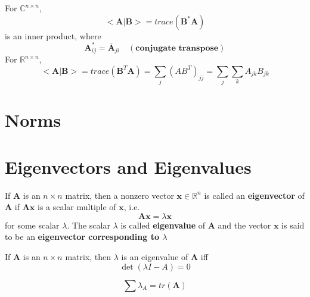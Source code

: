 			\begin{example}
				For $\mathbb{C}^{n\times n}$, 
				\begin{equation}
					<\mathbf{A}|\mathbf{B}> = trace(\mathbf{B}^* \mathbf{A})
				\end{equation}
				is an inner product, where
				\begin{equation}
					\mathbf{A}^*_{ij} = \bar{\mathbf{A}}_{ji} \quad (\textbf{conjugate transpose})
				\end{equation}
				For $\mathbb{R}^{n\times n}$,
				\begin{equation}
					<\mathbf{A}|\mathbf{B}> = trace(\mathbf{B}^T \mathbf{A}) = \sum_j (AB^T)_{jj} = \sum_j\sum_k A_{jk}B_{jk}
				\end{equation}
			\end{example}
			
		\section{Norms}

		\section{Eigenvectors and Eigenvalues}
			\begin{definition}
				If $\mathbf{A}$ is an $n \times n$ matrix, then a nonzero vector $\mathbf{x} \in \mathbb{R}^n$ is called an \textbf{eigenvector} of $\mathbf{A}$ if $\mathbf{Ax}$ is a scalar multiple of $\mathbf{x}$, i.e.
				\begin{equation}
					\mathbf{Ax} = \lambda \mathbf{x}
				\end{equation}
				for some scalar $\lambda$. The scalar $\lambda$ is called \textbf{eigenvalue} of $\mathbf{A}$ and the vector $\mathbf{x}$ is said to be an \textbf{eigenvector corresponding to $\lambda$}
			\end{definition}

			\begin{theorem}
				If $\mathbf{A}$ is an $n \times n$ matrix, then $\lambda$ is an eigenvalue of $\mathbf{A}$ iff
				\begin{equation}
					\det(\lambda I - A) = 0
				\end{equation}
			\end{theorem}

			\begin{corollary}
				\begin{equation}
					\sum \lambda_A = tr(\mathbf{A})
				\end{equation}
			\end{corollary}

